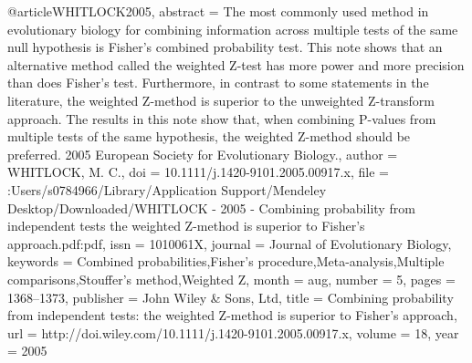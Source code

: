 @article{WHITLOCK2005,
abstract = {The most commonly used method in evolutionary biology for combining information across multiple tests of the same null hypothesis is Fisher's combined probability test. This note shows that an alternative method called the weighted Z-test has more power and more precision than does Fisher's test. Furthermore, in contrast to some statements in the literature, the weighted Z-method is superior to the unweighted Z-transform approach. The results in this note show that, when combining P-values from multiple tests of the same hypothesis, the weighted Z-method should be preferred. {\textcopyright} 2005 European Society for Evolutionary Biology.},
author = {WHITLOCK, M. C.},
doi = {10.1111/j.1420-9101.2005.00917.x},
file = {:Users/s0784966/Library/Application Support/Mendeley Desktop/Downloaded/WHITLOCK - 2005 - Combining probability from independent tests the weighted Z-method is superior to Fisher's approach.pdf:pdf},
issn = {1010061X},
journal = {Journal of Evolutionary Biology},
keywords = {Combined probabilities,Fisher's procedure,Meta-analysis,Multiple comparisons,Stouffer's method,Weighted Z},
month = {aug},
number = {5},
pages = {1368--1373},
publisher = {John Wiley {\&} Sons, Ltd},
title = {{Combining probability from independent tests: the weighted Z-method is superior to Fisher's approach}},
url = {http://doi.wiley.com/10.1111/j.1420-9101.2005.00917.x},
volume = {18},
year = {2005}
}
